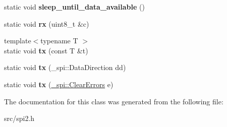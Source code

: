 \begin{DoxyCompactItemize}
\item 
static void {\bfseries sleep\+\_\+until\+\_\+data\+\_\+available} ()\hypertarget{classSpiAsync_ac331985faf13e5d59aedb527d6569897}{}\label{classSpiAsync_ac331985faf13e5d59aedb527d6569897}

\item 
static void {\bfseries rx} (uint8\+\_\+t \&c)\hypertarget{classSpiAsync_a910512efb3843f9c720672fea2bbaa44}{}\label{classSpiAsync_a910512efb3843f9c720672fea2bbaa44}

\item 
{\footnotesize template$<$typename T $>$ }\\static void {\bfseries tx} (const T \&t)\hypertarget{classSpiAsync_a64c1c4c56dffff43cb708c654b5e5d1f}{}\label{classSpiAsync_a64c1c4c56dffff43cb708c654b5e5d1f}

\item 
static void {\bfseries tx} (\+\_\+spi\+::\+Data\+Direction dd)\hypertarget{classSpiAsync_aead9b9def923820e34e4333c8f754495}{}\label{classSpiAsync_aead9b9def923820e34e4333c8f754495}

\item 
static void {\bfseries tx} (\hyperlink{class__transmission_1_1ClearErrors}{\+\_\+spi\+::\+Clear\+Errors} e)\hypertarget{classSpiAsync_a4e51a913230f9ee7e3fcb24939ca0eca}{}\label{classSpiAsync_a4e51a913230f9ee7e3fcb24939ca0eca}

\end{DoxyCompactItemize}


The documentation for this class was generated from the following file\+:\begin{DoxyCompactItemize}
\item 
src/spi2.\+h\end{DoxyCompactItemize}
